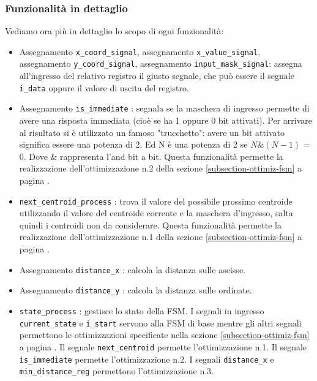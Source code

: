 \documentclass{article}
\begin{document}
\subsubsection{Funzionalità in dettaglio}
Vediamo ora più in dettaglio lo scopo di ogni funzionalità:
\begin{itemize}
    \item Assegnamento \verb^x_coord_signal^, assegnamento \verb^x_value_signal^, assegnamento \verb^y_coord_signal^, assegnamento \verb^input_mask_signal^: assegna all'ingresso del relativo registro il giusto segnale, che può essere il segnale \verb^i_data^ oppure il valore di uscita del registro.
    \item Assegnamento \verb^is_immediate^ : segnala se la maschera di ingresso permette di avere una risposta immediata (cioè se ha 1 oppure 0 bit attivati). Per arrivare al risultato si è utilizzato un famoso "trucchetto": avere un bit attivato significa essere una potenza di 2. Ed N è una potenza di 2 se \(N \& (N-1)\) = 0. Dove \& rappresenta l'and bit a bit. Questa funzionalità permette la realizzazione dell'ottimizzazione n.2 della sezione \ref{subsection-ottimiz-fsm} a pagina \pageref{subsection-ottimiz-fsm}.
    \item \verb^next_centroid_process^ : trova il valore del possibile prossimo centroide utilizzando il valore del centroide corrente e la maschera d'ingresso, salta quindi i centroidi non da considerare. Questa funzionalità permette la realizzazione dell'ottimizzazione n.1 della sezione \ref{subsection-ottimiz-fsm} a pagina \pageref{subsection-ottimiz-fsm}.
    \item Assegnamento \verb^distance_x^ : calcola la distanza sulle ascisse.
    \item Assegnamento \verb^distance_y^ : calcola la distanza sulle ordinate.
    \item \verb^state_process^ : gestisce lo stato della FSM. I segnali in ingresso \verb^current_state^ e \verb^i_start^ servono alla FSM di base mentre gli altri segnali permettono le ottimizzazioni specificate nella sezione \ref{subsection-ottimiz-fsm} a pagina \pageref{subsection-ottimiz-fsm}. Il segnale \verb^next_centroid^ permette l'ottimizzazione n.1. Il segnale \verb^is_immediate^ permette l'ottimizzazione n.2. I segnali \verb^distance_x^ e \verb^min_distance_reg^ permettono l'ottimizzazione n.3.

\end{itemize}
\end{document}
